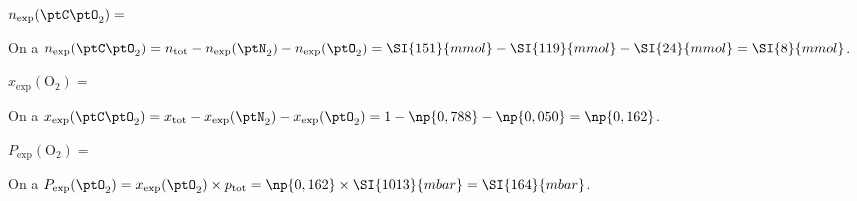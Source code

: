 

\begin{enonce}
$n_\mathrm{exp}(\ptC\ptO_2)=$
\end{enonce}


\begin{corrige}
On a $n_\mathrm{exp}(\ptC\ptO_2) = n_\mathrm{tot}-n_\mathrm{exp}(\ptN_2) - n_\mathrm{exp}(\ptO_2)    =\SI{151}{mmol}- \SI{119}{mmol} - \SI{24}{mmol}=\SI{8}{mmol}$. 
\end{corrige}



\begin{enonce}
$x_\mathrm{exp}(\mathrm{O}_2)=$
\end{enonce}


\begin{corrige}
On a $x_\mathrm{exp}(\ptC\ptO_2)= x_\mathrm{tot}-x_\mathrm{exp}(\ptN_2)-x_\mathrm{exp}(\ptO_2) = 1-\np{0,788}-\np{0,050}=\np{0,162}$.
\end{corrige}



\begin{enonce}
$P_\mathrm{exp}(\mathrm{O}_2)=$
\end{enonce}


\begin{corrige}
On a $P_\mathrm{exp}(\ptO_2)=x_\mathrm{exp}(\ptO_2)\times p_\mathrm{tot}= \np{0,162} \times \SI{1013}{mbar}  =\SI{164}{mbar}$. 
\end{corrige}



